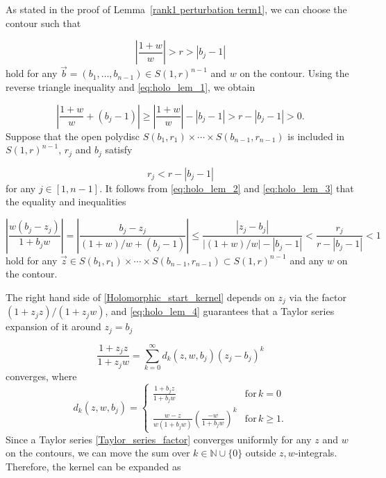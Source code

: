 \documentclass[cmp]{svjour}
\numberwithin{theorem}{section}
\numberwithin{equation}{section}
\begin{document}
As stated in the proof of Lemma~\ref{rank1 perturbation term1}, we can choose the contour such that

\begin{equation}
\label{eq:holo_lem_1}
\left| \frac{1 + w}{w} \right| > r > \left| b_j - 1 \right|
\end{equation}
hold for any $\vec{b} = (b_1, \ldots, b_{n-1}) \in {S(1,r)}^{n-1}$ and $w$ on the contour. Using the reverse triangle inequality and \eqref{eq:holo_lem_1}, we obtain

\begin{equation}
\label{eq:holo_lem_2}
\left| \frac{1+w}{w} + (b_j - 1) \right| \geq \left| \frac{1 + w}{w} \right| - |b_j - 1| >  r - |b_j - 1|  > 0.
\end{equation}
Suppose that the open polydisc $S(b_1, r_1) \times \cdots \times S(b_{n-1}, r_{n-1})$ is included in ${S(1,r)}^{n-1}$, $r_j$ and $b_j$ satisfy

\begin{equation}
\label{eq:holo_lem_3}
r_j < r - |b_j - 1|
\end{equation} 
for any $j \in [1,n-1]$.
It follows from \eqref{eq:holo_lem_2} and \eqref{eq:holo_lem_3} that the equality and inequalities

\begin{equation}
\label{eq:holo_lem_4}
\left| \frac{ w(b_j - z_j)}{1 + b_j w} \right| = \left| \frac{b_j - z_j}{ (1 + w)/w + (b_j - 1) } \right| \leq \frac{|z_j - b_j|}{ \left| (	1 + w)/w \right| - \left| b_j - 1 \right| } < \frac{r_j}{r - | b_j - 1 |} < 1
\end{equation}
hold for any $\vec{z} \in S(b_1, r_1) \times \cdots \times S(b_{n-1}, r_{n-1}) \subset {S(1,r)}^{n-1}$ and any $w$ on the contour.

The right hand side of \eqref{Holomorphic_start_kernel} depends on $z_j$ via the factor $(1+z_j z)/(1 + z_j w)$, and
\eqref{eq:holo_lem_4} guarantees that a Taylor series expansion of it around $z_j = b_j$


\begin{equation}
\label{Taylor_series_factor}
    \frac{1+z_j z}{1 + z_j w} = \sum_{k=0}^{\infty}{ d_k(z,w,b_j) {(z_j - b_j)}^k }
\end{equation}
converges, where
\begin{equation*}
    d_k(z,w,b_j) = 
    \begin{cases} 
    \frac{1+b_j z}{1+b_j w} & \mathrm{for}\, k=0 \\
    \frac{w-z}{w(1 + b_j w)} {\left( \frac{-w}{1+b_j w} \right)}^k & \mathrm{for}\, k \geq 1 .
    \end{cases}
\end{equation*}
Since a Taylor series \eqref{Taylor_series_factor} converges uniformly for any $z$ and $w$ on the contours, we can move the sum over $k \in \mathbb{N} \cup \{ 0 \}$ outside $z, w$-integrals.
Therefore, the kernel can be expanded as
\end{document}
